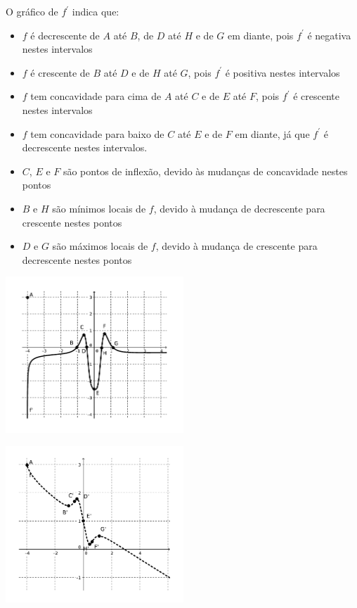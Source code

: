 \documentclass[12pt,a4paper]{article}
\begin{document}
\begin{enumerate}
\begin{minipage}[]{0.57\linewidth}
O gráfico de $f^\prime$ indica que:
\begin{itemize}
\item $f$ é decrescente de $A$ até $B$, de $D$ até $H$ e de $G$ em diante, pois $f^\prime$ é negativa nestes intervalos
\item $f$ é crescente de $B$ até $D$ e de $H$ até $G$, pois $f^\prime$ é positiva nestes intervalos
\item $f$ tem concavidade para cima de $A$ até $C$ e de $E$ até $F$, pois $f^\prime$ é crescente nestes intervalos
\item $f$ tem concavidade para baixo de $C$ até $E$ e de $F$ em diante, já que $f^\prime$ é decrescente nestes intervalos.
\item $C$, $E$ e $F$ são pontos de inflexão, devido às mudanças de concavidade nestes pontos
\item $B$ e $H$ são mínimos locais de $f$, devido à mudança de decrescente para crescente nestes pontos
\item $D$ e $G$ são máximos locais de $f$, devido à mudança de crescente para decrescente nestes pontos
\end{itemize}
\end{minipage}
\begin{minipage}[]{0.42\linewidth}
\includegraphics[width=6.7cm]{img/prova-3-mat-grafico-f'}

\includegraphics[width=6.7cm]{img/prova-3-mat-grafico-f}
\end{minipage}
\end{enumerate}
\end{document}
